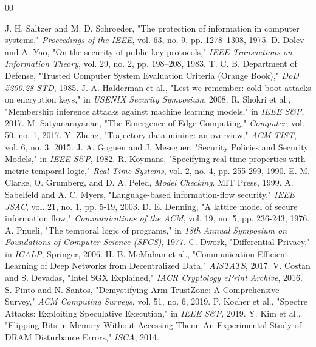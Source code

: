 \documentclass[conference]{IEEEtran}
\begin{document}
\begin{thebibliography}{00}

 J. H. Saltzer and M. D. Schroeder, "The protection of information in computer systems," \textit{Proceedings of the IEEE}, vol. 63, no. 9, pp. 1278--1308, 1975.
 D. Dolev and A. Yao, "On the security of public key protocols," \textit{IEEE Transactions on Information Theory}, vol. 29, no. 2, pp. 198--208, 1983.
 T. C. B. Department of Defense, "Trusted Computer System Evaluation Criteria (Orange Book)," \textit{DoD 5200.28-STD}, 1985.
 J. A. Halderman et al., "Lest we remember: cold boot attacks on encryption keys," in \textit{USENIX Security Symposium}, 2008.
 R. Shokri et al., "Membership inference attacks against machine learning models," in \textit{IEEE S\&P}, 2017.
 M. Satyanarayanan, "The Emergence of Edge Computing," \textit{Computer}, vol. 50, no. 1, 2017.
 Y. Zheng, "Trajectory data mining: an overview," \textit{ACM TIST}, vol. 6, no. 3, 2015.
 J. A. Goguen and J. Meseguer, "Security Policies and Security Models," in \textit{IEEE S\&P}, 1982.
 R. Koymans, "Specifying real-time properties with metric temporal logic," \textit{Real-Time Systems}, vol. 2, no. 4, pp. 255-299, 1990.
 E. M. Clarke, O. Grumberg, and D. A. Peled, \textit{Model Checking}. MIT Press, 1999.
 A. Sabelfeld and A. C. Myers, "Language-based information-flow security," \textit{IEEE JSAC}, vol. 21, no. 1, pp. 5-19, 2003.
 D. E. Denning, "A lattice model of secure information flow," \textit{Communications of the ACM}, vol. 19, no. 5, pp. 236-243, 1976.
 A. Pnueli, "The temporal logic of programs," in \textit{18th Annual Symposium on Foundations of Computer Science (SFCS)}, 1977.
 C. Dwork, "Differential Privacy," in \textit{ICALP}, Springer, 2006.
 H. B. McMahan et al., "Communication-Efficient Learning of Deep Networks from Decentralized Data," \textit{AISTATS}, 2017.
 V. Costan and S. Devadas, "Intel SGX Explained," \textit{IACR Cryptology ePrint Archive}, 2016.
 S. Pinto and N. Santos, "Demystifying Arm TrustZone: A Comprehensive Survey," \textit{ACM Computing Surveys}, vol. 51, no. 6, 2019.
 P. Kocher et al., "Spectre Attacks: Exploiting Speculative Execution," in \textit{IEEE S\&P}, 2019.
 Y. Kim et al., "Flipping Bits in Memory Without Accessing Them: An Experimental Study of DRAM Disturbance Errors," \textit{ISCA}, 2014.

\end{thebibliography}
\end{document}
